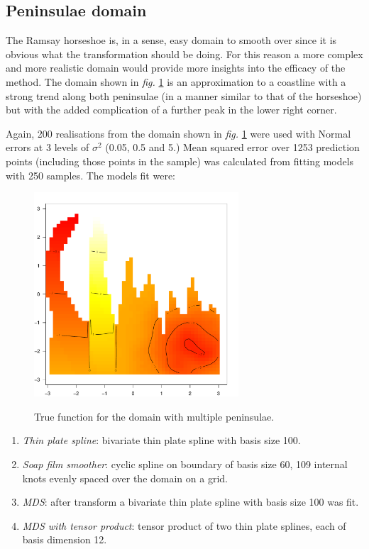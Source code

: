 \documentclass[a4paper,10pt]{article}
\newcommand{\fig}[1]{\emph{fig.} \ref{#1}}
\begin{document}
\subsection{Peninsulae domain}

The Ramsay horseshoe is, in a sense, easy domain to smooth over since it is obvious what the transformation should be doing. For this reason a more complex and more realistic domain would provide more insights into the efficacy of the method. The domain shown in \fig{wt2-truth} is an approximation to a coastline with a strong trend along both peninsulae (in a manner similar to that of the horseshoe) but with the added complication of a further peak in the lower right corner.

Again, 200 realisations from the domain shown in \fig{wt2-truth} were used with Normal errors at 3 levels of $\sigma^2$ (0.05, 0.5 and 5.) Mean squared error over 1253 prediction points (including those points in the sample) was calculated from fitting models with 250 samples. The models fit were:

\begin{figure}
\centering
\includegraphics[width=3in]{figs/wt2-truth.pdf} \\
\caption{True function for the domain with multiple peninsulae.}
\label{wt2-truth}
\end{figure}

\begin{enumerate}
\item \emph{Thin plate spline}: bivariate thin plate spline with basis size 100. 
\item \emph{Soap film smoother}: cyclic spline on boundary of basis size 60, 109 internal knots evenly spaced over the domain on a grid.
\item \emph{MDS}: after transform a bivariate thin plate spline with basis size 100 was fit. 
\item \emph{MDS with tensor product}: tensor product of two thin plate splines, each of basis dimension 12.
\end{enumerate} 
\end{document}
